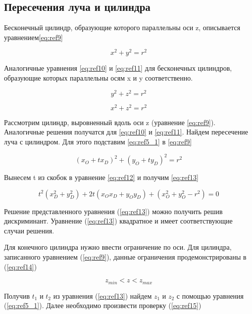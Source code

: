 \subsection {Пересечения луча и цилиндра}

Бесконечный цилиндр, образующие которого параллельны оси z, описывается уравнением\eqref{eq:ref9}

\begin{equation}
	x^2 + y^2 = r^2
	\label{eq:ref9}
\end{equation}

Аналогичные уравнения \eqref{eq:ref10} и \eqref{eq:ref11} для
бесконечных цилиндров, образующие которых параллельны осям x и y соответственно.

\begin{equation}
	y^2 + z^2 = r^2
	\label{eq:ref10}
\end{equation}

\begin{equation}
	x^2 + z^2 = r^2
	\label{eq:ref11}
\end{equation}

Рассмотрим цилиндр, выровненный вдоль оси z (уравнение \ref{eq:ref9}).
Аналогичные решения получатся для \eqref{eq:ref10} и \eqref{eq:ref11}.
Найдем пересечение луча с цилиндром.
Для этого подставим \eqref{eq:ref5_1} в \eqref{eq:ref9}

\begin{equation}
	(x_O + t x_D)^2 + (y_O + t y_D)^2 = r^2
	\label{eq:ref12}
\end{equation}

Вынесем t из скобок в уравнение \eqref{eq:ref12} и получим \eqref{eq:ref13}

\begin{equation}
	t^2(x_D^2+y_D^2) + 2t(x_Ox_D + y_Oy_D) + (x_O^2 + y_O^2 - r^2) = 0
	\label{eq:ref13}
\end{equation}

Решение представленного уравнения (\ref{eq:ref13}) можно получить решив дискриминант.
Уравнение (\ref{eq:ref13}) квадратное и имеет соответствующие случаи решения.


Для конечного цилиндра нужно ввести ограничение по оси.
Для цилиндра, записанного уравнением (\ref{eq:ref9}), данные ограничения
продемонстрированы в (\ref{eq:ref14})

\begin{equation}
	z_{min} < z < z_{max}
	\label{eq:ref14}
\end{equation}

Получив $t_1$ и $t_2$ из уравнения (\ref{eq:ref13})
найдем $z_1$ и $z_2$ с помощью уравнения (\ref{eq:ref5_1}).
Далее необходимо произвести проверку (\ref{eq:ref15})

